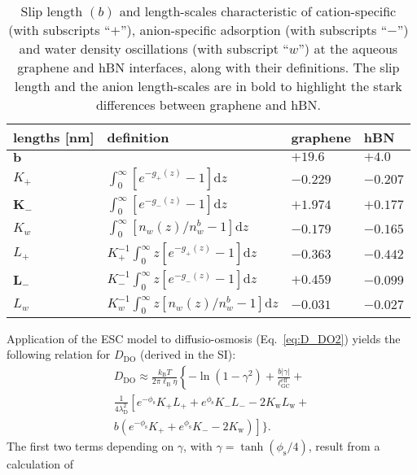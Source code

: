 \documentclass[journal=ancac3,manuscript=article,layout=twocolumn]{achemso}
\newcommand\Tstrut{\rule{0pt}{2.8ex}}
\newcommand\Bstrut{\rule[-1.ex]{0pt}{0pt}}   %
\newcommand{\kt}{k_\text{B}T}
\newcommand{\lB}{\ell_\text{B}}
\newcommand{\debye}{\lambda_\text{D}}
\newcommand{\lGC}{\ell_\text{GC}}
\newcommand{\phis}{\phi_\text{s}}
\begin{document}
%
\begin{table*}[t!]
  \centering
\begin{tabular}{ P{3.5cm}P{5.0cm}P{3.5cm}P{3.5cm}}
\hline
\hline
  \centering
 lengths [nm]&definition&graphene&hBN\Tstrut\Bstrut\\
 \hline
 \Tstrut\Bstrut
   $\bm{b}$&  &$\bm{+19.6}$&$\bm{+4.0}$\Tstrut\Bstrut\\
   $K_+$&$\int_0^{\infty}  [e^{-g_+(z)}-1]\mathrm{d}z$&$-0.229$&$-0.207$\Tstrut\Bstrut\\
   $\bm{K_-}$&$\int_0^{\infty}  [e^{-g_-(z)}-1]\mathrm{d}z$&$\bm{+1.974}$&$\bm{+0.177}$\Tstrut\Bstrut\\
   $K_w$&$\int_0^{\infty}  [ n_w(z)/n_w^{b} -1]\mathrm{d}z$&$-0.179$&$-0.165$\Tstrut\Bstrut\\
   $L_+$&$K_+^{-1}\int_0^{\infty} z[e^{-g_+(z)}-1] \mathrm{d}z$&$-0.363$&$-0.442$\Tstrut\Bstrut\\
      $\bm{L_-}$&$K_-^{-1}\int_0^{\infty} z[e^{-g_-(z)}-1] \mathrm{d}z$&$\bm{+0.459}$&$\bm{-0.099}$\Tstrut\Bstrut\\
   $L_w$&$K_w^{-1}\int_0^{\infty}  z[ n_w(z)/n_w^{b} -1]\mathrm{d}z$&$-0.031$&$-0.027$\Tstrut\Bstrut\\
\hline
\hline
\end{tabular}
\caption{Slip length $(b)$ and length-scales characteristic
of cation-specific (with subscripts ``$+$''),
anion-specific adsorption (with subscripts ``$-$'') and water
density oscillations (with subscript ``$w$'')
at the aqueous graphene and hBN interfaces,
along with their definitions.
The slip length and the anion length-scales are
in bold to highlight the stark differences between graphene and hBN.}
\label{table:1}
\end{table*}
Application of the ESC model to diffusio-osmosis
(Eq.~\eqref{eq:D_DO2}) yields the following
relation for $D_\text{DO}$ (derived in the SI):
\begin{multline}
\label{eq:D_DO_mGC}
    D_\text{DO}
    \approx \frac{\kt}{2\pi\lB\eta} \left\{ -\ln\left(1-\gamma^2\right) + \frac{b|\gamma|}{\lGC^\text{eff}} + \right. \\
    \left. \frac{1}{4\debye^2} \left[ e^{-\phis} K_+ L_+ + e^{\phis} K_- L_- -2 K_\text{w} L_\text{w} + \right. \right. \\  \left. b \left( e^{-\phis} K_+ + e^{\phis} K_- -2 K_\text{w} \right) \right] \bigg \}.
\end{multline}
%
The first two terms depending on $\gamma$, with
$\gamma = \tanh (\phis/4)$,
result from a calculation of
\end{document}
